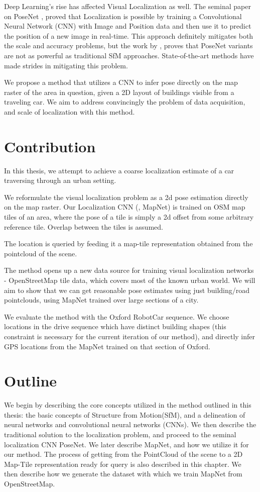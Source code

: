 Deep Learning's rise has affected Visual Localization as well. The seminal paper on PoseNet \cite{Kendall2015}, proved that Localization is possible by training a Convolutional Neural Network (CNN) with Image and Position data and then use it to predict the position of a new image in real-time. This approach definitely mitigates both the scale and accuracy problems, but the work by \cite{Sattler2019}, proves that PoseNet variants are not as powerful as traditional SfM approaches. State-of-the-art methods have made strides in mitigating this problem.

We propose a method that utilizes a CNN to infer pose directly on the map raster of the area in question, given a 2D layout of buildings visible from a traveling car. We aim to address convincingly the problem of data acquisition, and scale of localization with this method.  

\section{Contribution}
In this thesis, we attempt to achieve a coarse localization estimate of a car traversing through an urban setting. 

We reformulate the visual localization problem as a 2d pose estimation directly on the map raster. Our Localization CNN (\cite{Brahmbhatt2018}, MapNet) is trained on OSM map tiles of an area, where the pose of a tile is simply a 2d offset from some arbitrary reference tile. Overlap between the tiles is assumed.    

The location is queried by feeding it a map-tile representation obtained from the pointcloud of the scene. 

The method opens up a new data source for training visual localization networks - OpenStreetMap tile data, which covers most of the known urban world. We will aim to show that we can get reasonable pose estimates using just building/road pointclouds, using MapNet trained over large sections of a city. 

We evaluate the method with the Oxford RobotCar sequence. We choose locations in the drive sequence which have distinct building shapes (this constraint is necessary for the current iteration of our method), and directly infer GPS locations from the MapNet trained on that section of Oxford. 

\section{Outline}
We begin by describing the core concepts utilized in the method outlined in this thesis: the basic concepts of Structure from Motion(SfM), and a delineation of neural networks and convolutional neural networks (CNNs). We then describe the traditional solution to the localization problem, and proceed to the seminal localization CNN PoseNet. We later describe MapNet, and how we utilize it for our method. The process of getting from the PointCloud of the scene to a 2D Map-Tile representation ready for query is also described in this chapter. We then describe how we generate the dataset with which we train MapNet from OpenStreetMap.

